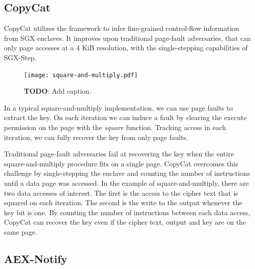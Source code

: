 \documentclass{llncs}
\begin{document}

\subsection{CopyCat}

CopyCat \cite{MoghimiBHPS20} utilizes the framework
to infer fine-grained control-flow information from SGX enclaves.
It improves upon traditional page-fault adversaries,
that can only page accesses at a 4 KiB resolution,
with the single-stepping capabilities of SGX-Step.

\begin{figure}[t]
  \centering
  \texttt{[image: square-and-multiply.pdf]}
  \caption{\textbf{TODO}: Add caption.}
  \label{fig:square-and-multiply}
\end{figure}

In a typical square-and-multiply implementation,
we can use page faults to extract the key.
On each iteration we can induce a fault by clearing the execute permission on
the page with the \emph{square} function.
Tracking access in each iteration, we can fully recover the key from only page faults.

Traditional page-fault adversaries fail at recovering the key when the entire
square-and-multiply procedure fits on a single page.
CopyCat overcomes this challenge by single-stepping the enclave and counting the
number of instructions until a data page was accessed.
In the example of square-and-multiply, there are two data accesses of interest.
The first is the access to the cipher text that is squared on each iteration.
The second is the write to the output whenever the key bit is one.
By counting the number of instructions between each data access,
CopyCat can recover the key even if the cipher text, output and key are on the same page.


\subsection{AEX-Notify}
\label{sec:aex-notify}
\end{document}
